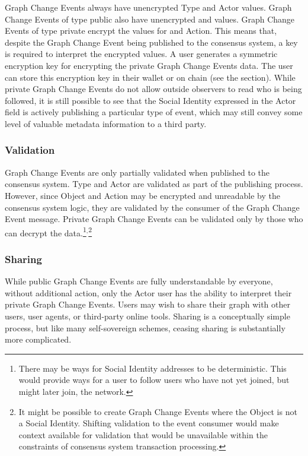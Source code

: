 \documentclass[12pt,letterpaper]{article}
\begin{document}
Graph Change Events always have unencrypted Type and Actor values. Graph Change Events of
type public also have unencrypted  and  values. Graph Change Events
of type private encrypt the values for  and Action. This means that, despite the
Graph Change Event being published to the consensus system, a key is required to interpret
the encrypted values. A user generates a symmetric encryption key for encrypting the private
Graph Change Events data. The user can store this encryption key in their wallet or on chain
(see the  section).  While private Graph Change Events do not allow outside
observers to read who is being followed, it is still possible to see that the Social
Identity expressed in the Actor field is actively publishing a particular type of event,
which may still convey some level of valuable metadata information to a third party.

\subsubsection{Validation}

Graph Change Events are only partially validated when published to the consensus
system. Type and Actor are validated as part of the publishing process. However, since
Object and Action may be encrypted and unreadable by the consensus system logic, they are
validated by the consumer of the Graph Change Event message. Private Graph Change Events can
be validated only by those who can decrypt the data.\footnote{There may be ways for Social
  Identity addresses to be deterministic. This would provide ways for a user to follow users
  who have not yet joined, but might later join, the network.}$^{,}$\footnote{It might be
  possible to create Graph Change Events where the Object is not a Social Identity.
  Shifting validation to the event consumer would make context available for validation that
  would be unavailable within the constraints of consensus system transaction processing.}

\subsubsection{Sharing}

While public Graph Change Events are fully understandable by everyone, without additional
action, only the Actor user has the ability to interpret their private Graph Change
Events. Users may wish to share their graph with other users, user agents, or third-party
online tools. Sharing is a conceptually simple process, but like many self-sovereign
schemes, ceasing sharing is substantially more complicated.
\end{document}
